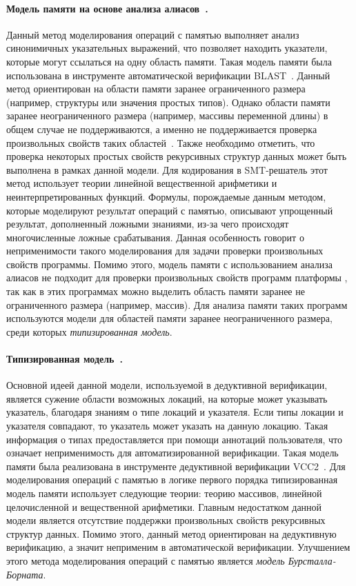 \paragraph{Модель памяти на основе анализа алиасов~\cite{andersen1994program}.} Данный метод моделирования операций с памятью выполняет анализ синонимичных указательных выражений, что позволяет находить указатели, которые могут ссылаться на одну область памяти. Такая модель памяти была использована в инструменте автоматической верификации \textsc{BLAST}~\cite{beyer2007software}. Данный метод ориентирован на области памяти заранее ограниченного размера (например, структуры или значения простых типов). Однако области памяти заранее неограниченного размера (например, массивы переменной длины) в общем случае не поддерживаются, а именно не поддерживается проверка произвольных свойств таких областей~\cite{mandrik}. Также необходимо отметить, что проверка некоторых простых свойств рекурсивных структур данных может быть выполнена в рамках данной модели.
Для кодирования в SMT-решатель этот метод использует теории линейной вещественной арифметики и неинтерпретированных функций. Формулы, порождаемые данным методом, которые моделируют результат операций с памятью, описывают упрощенный результат, дополненный ложными знаниями, из-за чего происходят многочисленные ложные срабатывания. Данная особенность говорит о неприменимости такого моделирования для задачи проверки произвольных свойств программы. Помимо этого, модель памяти с использованием анализа алиасов не подходит для проверки произвольных свойств программ платформы \dotnet{}, так как в этих программах можно выделить область памяти заранее не ограниченного размера (например, массив). Для анализа памяти таких программ используются модели для областей памяти заранее неограниченного размера, среди которых \emph{типизированная модель}.

\paragraph{Типизированная модель~\cite{cohen2009precise}.} Основной идеей данной модели, используемой в дедуктивной верификации, является сужение области возможных локаций, на которые может указывать указатель, благодаря знаниям о типе локаций и указателя. Если типы локации и указателя совпадают, то указатель может указать на данную локацию. Такая информация о типах предоставляется при помощи аннотаций пользователя, что означает неприменимость для автоматизированной верификации. Такая модель памяти была реализована в инструменте дедуктивной верификации VCC2~\cite{cohen2009vcc}. Для моделирования операций с памятью в логике первого порядка типизированная модель памяти использует следующие теории: теорию массивов, линейной целочисленной и вещественной арифметики. Главным недостатком данной модели является отсутствие поддержки произвольных свойств рекурсивных структур данных. Помимо этого, данный метод ориентирован на дедуктивную верификацию, а значит неприменим в автоматической верификации. Улучшением этого метода моделирования операций с памятью является \emph{модель Бурсталла-Борната}.

